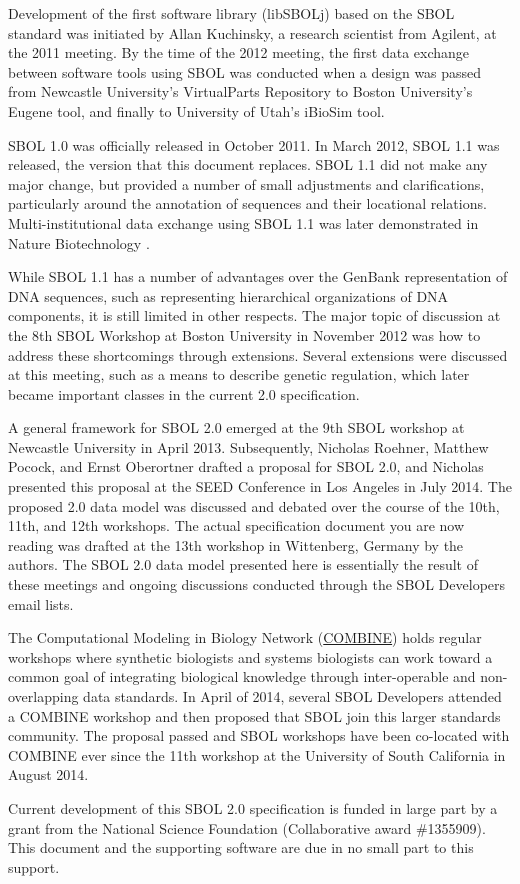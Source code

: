 Development of the first software library (libSBOLj) based on the SBOL standard was initiated by Allan Kuchinsky, a research scientist from Agilent, at the 2011 meeting.  By the time of the 2012 meeting, the first data exchange between software tools using SBOL was conducted when a design was passed from Newcastle University's VirtualParts Repository to Boston University's Eugene tool, and finally to University of Utah's iBioSim tool. 

SBOL 1.0 was officially released in October 2011.  In March 2012, SBOL 1.1 was released, the version that this document replaces. SBOL 1.1 did not make any major change, but provided a number of small adjustments and clarifications, particularly around the annotation of sequences and their locational relations.  Multi-institutional data exchange using SBOL 1.1 was later demonstrated in Nature Biotechnology \cite{galdzicki2014synthetic}. 

While SBOL 1.1 has a number of advantages over the GenBank representation of DNA sequences, such as representing hierarchical organizations of DNA components, it is still limited in other respects.  The major topic of discussion at the 8th SBOL Workshop at Boston University in November 2012 was how to address these shortcomings through extensions.  Several extensions were discussed at this meeting, such as a means to describe genetic regulation, which later became important classes in the current 2.0 specification.  

A general framework for SBOL 2.0 emerged at the 9th SBOL workshop at Newcastle University in April 2013.  Subsequently, Nicholas Roehner, Matthew Pocock, and Ernst Oberortner drafted a proposal for SBOL 2.0, and Nicholas presented this proposal at the SEED Conference in Los Angeles \cite{roehner2014proposed} in July 2014.  The proposed 2.0 data model was discussed and debated over the course of the 10th, 11th, and 12th workshops.  The actual specification document you are now reading was drafted at the 13th workshop in Wittenberg, Germany by the authors. The SBOL 2.0 data model presented here is essentially the result of these meetings and ongoing discussions conducted through the SBOL Developers email lists.

The Computational Modeling in Biology Network (\href{www.co.mbine.org}{COMBINE}) holds regular workshops where synthetic biologists and systems biologists can work toward a common goal of integrating biological knowledge through inter-operable and non-overlapping data standards.  In April of 2014, several SBOL Developers attended a COMBINE workshop and then proposed that SBOL join this larger standards community.  The proposal passed and SBOL workshops have been co-located with COMBINE ever since the 11th workshop at the University of South California in August 2014.

Current development of this SBOL 2.0 specification is funded in large part by a grant from the National Science Foundation (Collaborative award \#1355909).  This document and the supporting software are due in no small part to this support.  

